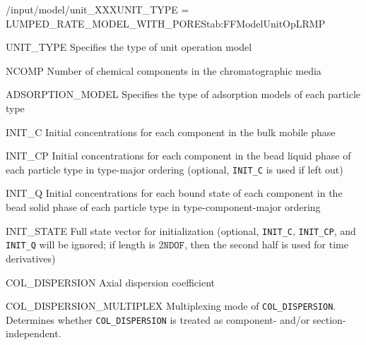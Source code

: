 \begin{condsubgroup}{/input/model/unit\_XXX}{UNIT\_TYPE = LUMPED\_RATE\_MODEL\_WITH\_PORES}{tab:FFModelUnitOpLRMP}
  \begin{dataset}[type=string,range={\texttt{LUMPED\_RATE\_MODEL\_WITH\_PORES}},length=1]{UNIT\_TYPE}
    Specifies the type of unit operation model
  \end{dataset}
  \begin{dataset}[type=int,range={$\geq 1$},length=1]{NCOMP}
    Number of chemical components in the chromatographic media
  \end{dataset}
  \begin{dataset}[type=string,range={See Section~\ref{sec:FFAdsorption}},length={\texttt{NPARTYPE}}]{ADSORPTION\_MODEL}
    Specifies the type of adsorption models of each particle type
  \end{dataset}
  \begin{dataset}[unit=\si{\mol\per\cubic\metre\of{IV}},type=double,range={$\geq 0$},length={\texttt{NCOMP}}]{INIT\_C}
    Initial concentrations for each component in the bulk mobile phase
  \end{dataset}
  \begin{dataset}[unit=\si{\mol\per\cubic\metre\of{MP}},type=double,range={$\geq 0$},length={$\texttt{NPARTYPE} \cdot \texttt{NCOMP}$}]{INIT\_CP}
    Initial concentrations for each component in the bead liquid phase of each particle type in type-major ordering (optional, \texttt{INIT\_C} is used if left out)
  \end{dataset}
  \begin{dataset}[unit=\si{\mol\per\cubic\metre\of{SP}},type=double,range={$\geq 0$},length={\texttt{NTOTALBND}}]{INIT\_Q}
    Initial concentrations for each bound state of each component in the bead solid phase of each particle type in type-component-major ordering
  \end{dataset}
  \begin{dataset}[unit=various,type=double,range={$\mathds{R}$},length={\texttt{NDOF} / $2\texttt{NDOF}$}]{INIT\_STATE}
    Full state vector for initialization (optional, \texttt{INIT\_C}, \texttt{INIT\_CP}, and \texttt{INIT\_Q} will be ignored; if length is $2\texttt{NDOF}$, then the second half is used for time derivatives)
  \end{dataset}
  \begin{dataset}[unit=\si{\square\metre\of{IV}\per\second},type=double,range={$\geq 0$},length={see \texttt{{COL\_DISPERSION\_MULTIPLEX}}}]{COL\_DISPERSION}
    Axial dispersion coefficient
  \end{dataset}
  \begin{dataset}[unit=--,type=int,range={$\{0, \dots, 3 \}$},length={1}]{COL\_DISPERSION\_MULTIPLEX}
    Multiplexing mode of \texttt{COL\_DISPERSION}.
    Determines whether \texttt{COL\_DISPERSION} is treated as component- and/or section-independent.


\end{dataset}
\end{condsubgroup}
